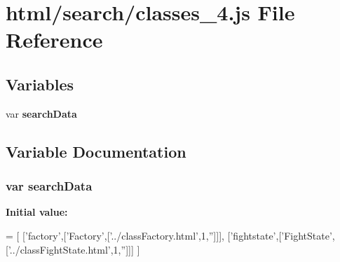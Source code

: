 \section{html/search/classes\-\_\-4.js File Reference}
\label{classes__4_8js}
\subsection*{Variables}
\begin{DoxyCompactItemize}
\item 
var {\bf search\-Data}
\end{DoxyCompactItemize}


\subsection{Variable Documentation}
\subsubsection[{search\-Data}]{\setlength{\rightskip}{0pt plus 5cm}var search\-Data}\label{classes__4_8js_ad01a7523f103d6242ef9b0451861231e}
{\bfseries Initial value\-:}
\begin{DoxyCode}
=
[
  [\textcolor{stringliteral}{'factory'},[\textcolor{stringliteral}{'Factory'},[\textcolor{stringliteral}{'../classFactory.html'},1,\textcolor{stringliteral}{''}]]],
  [\textcolor{stringliteral}{'fightstate'},[\textcolor{stringliteral}{'FightState'},[\textcolor{stringliteral}{'../classFightState.html'},1,\textcolor{stringliteral}{''}]]]
]
\end{DoxyCode}
